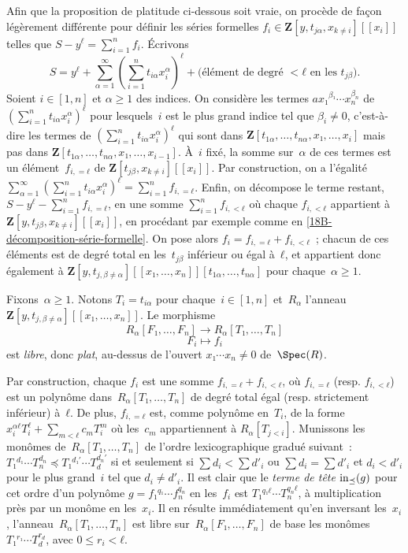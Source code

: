 \documentclass[10pt]{../fichiers-configuration-latex/smfart}
\begin{document}
\subsubsection{}
\label{18B-définition-fi}
Afin que la proposition de platitude ci-dessous soit vraie,
on procède de façon légèrement différente pour définir les
séries formelles $f_i ∈ 𝐙[y,t_{jα},x_{k ≠ i}][[x_i]]$ telles
que $S-y^ℓ=∑_{i=1}^n f_i$. Écrivons
\[
S=y^ℓ + ∑_{α=1}^∞ (∑_{i=1}^n t_{i α}x_i^α)^ℓ +
\big(\text{élément de degré }<ℓ\text{ en les }t_{jβ}\big).
\]
Soient $i ∈ [1,n]$ et $α ≥ 1$ des indices.
On considère les termes $ax₁^{β₁}\cdots x_n^{β_n}$ de $(∑_{i=1}^n t_{i α}x_i^α)^ℓ$
pour lesquels $i$ est le plus grand indice tel que $β_i ≠ 0$,
c'est-à-dire les termes de $(∑_{i=1}^n t_{i α}x_i^α)^ℓ$
qui sont dans $𝐙[t_{1 α},…,t_{n α},x₁,…,x_i]$ mais pas
dans $𝐙[t_{1 α},…,t_{n α},x₁,…,x_{i-1}]$.
À $i$ fixé, la somme sur $α$ de ces termes
est un élément $f_{i,=ℓ}$ de $𝐙[t_{jβ},x_{k ≠ i}][[x_i]]$.
Par construction, on a l'égalité
$ ∑_{α=1}^∞ (∑_{i=1}^n t_{i α}x_i^α)^ℓ=∑_{i=1}^n f_{i,=ℓ}$.
Enfin, on décompose le terme restant,
$S-y^ℓ-∑_{i=1}^n f_{i,=ℓ}$, en une somme $∑_{i=1}^n f_{i,<ℓ}$
où chaque $f_{i,<ℓ}$ appartient à $𝐙[y,t_{jβ},x_{k ≠ i}][[x_i]]$,
en procédant par exemple comme en \ref{18B-décomposition-série-formelle}.
On pose alors $f_i=f_{i,=ℓ}+f_{i,<ℓ}$ ; chacun de ces
éléments est de degré total en les $t_{j β}$ inférieur ou égal à $ℓ$,
et appartient donc également à $𝐙[y,t_{j,β ≠ α}][[x₁,…,x_n]][t_{1
α},…,t_{n α}]$ pour chaque $α ≥ 1$.

\begin{proposition2}
\label{18B-platitude-série-formelle-universelle}
Fixons $α ≥ 1$. Notons $T_i=t_{i α}$ pour chaque $i ∈ [1,n]$
et $R_α$ l'anneau $𝐙[y,t_{j,β ≠ α}][[x₁,…,x_n]]$.
Le morphisme
\[
R_α[F₁,…,F_n] → R_α[T₁,…,T_n]
\]
\[
F_i↦ f_i
\]
est \emph{libre}, donc \emph{plat}, au-dessus de l'ouvert
$x₁\cdots x_n ≠ 0$ de $\Spec(R)$.
\end{proposition2}

\begin{démo}
Par construction, chaque $f_i$ est une somme $f_{i,=ℓ} + f_{i,<ℓ}$, où
$f_{i,=ℓ}$ (resp. $f_{i,<ℓ}$) est un polynôme dans $R_α[T₁,…,T_n]$ de
degré total égal (resp. strictement inférieur) à $ℓ$.  De plus,
$f_{i,=ℓ}$ est, comme polynôme en $T_i$, de la forme $x_i^{αℓ} T_i^ℓ +
∑_{m<ℓ} c_m T_i^m$ où les $c_m$ appartiennent à $R_α[T_{j<i}]$.
Munissons les monômes de $R_α[T₁,…,T_n]$ de l'ordre lexicographique
gradué suivant : 
$T₁^{d₁} \cdots T_n^{d_n} \mathrel{\preceq} T₁^{d₁′} \cdots T_d^{d_n′}$
si et seulement si
$\sum d_i < \sum d′_i$ ou $\sum d_i = \sum
d′_i$ et $d_i < d'_i$ pour le plus grand $i$ tel que
$d_i \neq d'_i$.
Il est clair que le \emph{terme de tête} $\mathop{\mathrm{in}}_{\preceq}(g)$
pour cet ordre d'un polynôme $g=f₁^{q₁}\cdots f_n^{q_n}$
en les $f_i$ est $T₁^{q₁ ℓ}\cdots T_n^{q_n ℓ}$, à multiplication près
par un monôme en les $x_i$.
Il en résulte immédiatement qu'en inversant les $x_i$,
l'anneau $R_α[T₁,…,T_n]$ est libre sur $R_α[F₁,…,F_n]$
de base les monômes $T₁^{r₁}\cdots T_d^{r_d}$,
avec $0 ≤ r_i < ℓ$.
\end{démo}
\end{document}
